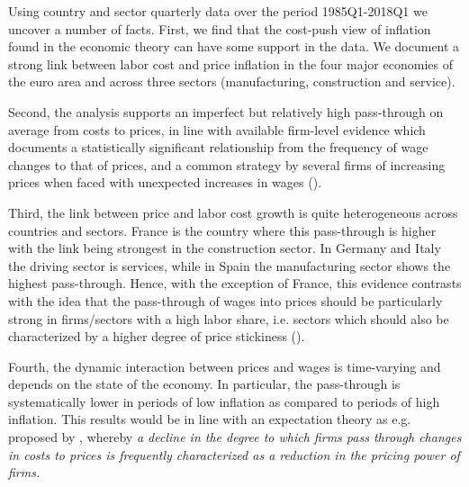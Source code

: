 \documentclass[11pt]{article}
\begin{document}
Using country and sector quarterly data over the period 1985Q1-2018Q1 we uncover a number of facts. First, we find that the cost-push view of inflation found in the economic theory can have some support in the data. We document a strong link between labor cost and price inflation in the four major economies of the euro area and across three sectors (manufacturing, construction and service). 

Second, the analysis supports an imperfect but relatively high pass-through on average from costs to prices, in line with available firm-level evidence which documents a statistically significant relationship from the frequency of wage changes to that of prices, and a common strategy by several firms of increasing prices when faced with unexpected increases in wages (\cite{WDN2009}).

Third, the link between price and labor cost growth is quite heterogeneous across countries and sectors. France is the country where this pass-through is higher with the link being strongest in the construction sector. In Germany and Italy the driving sector is services, while in Spain the manufacturing sector shows the highest pass-through. Hence, with the exception of France, this evidence contrasts with the idea that the pass-through of wages into prices should be particularly strong in firms/sectors with a high labor share, i.e. sectors which should also be characterized by a higher degree of price stickiness (\cite{WDN2009}). 

Fourth, the dynamic interaction between prices and wages is time-varying and depends on the state of the economy. In particular, the pass-through is systematically lower in periods of low inflation as compared to periods of high inflation. This results would be in line with an expectation theory as e.g. proposed by \cite{Taylor00}, whereby \textit{a decline in the degree to which firms pass through changes in costs to prices is frequently characterized as a reduction in the pricing power of firms.}      
\end{document}
